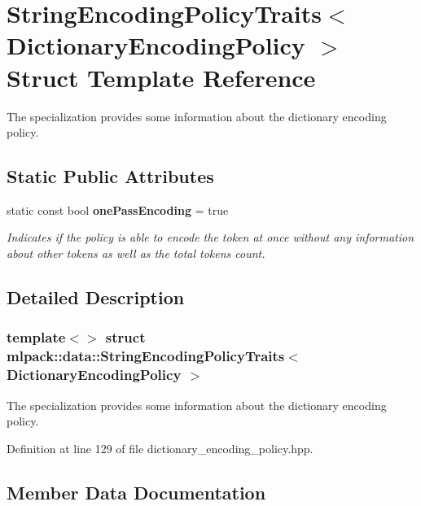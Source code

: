 \section{String\+Encoding\+Policy\+Traits$<$ Dictionary\+Encoding\+Policy $>$ Struct Template Reference}
\label{structmlpack_1_1data_1_1StringEncodingPolicyTraits_3_01DictionaryEncodingPolicy_01_4}


The specialization provides some information about the dictionary encoding policy.  


\subsection*{Static Public Attributes}
\begin{DoxyCompactItemize}
\item 
static const bool \textbf{ one\+Pass\+Encoding} = true
\begin{DoxyCompactList}\small\item\em Indicates if the policy is able to encode the token at once without any information about other tokens as well as the total tokens count. \end{DoxyCompactList}\end{DoxyCompactItemize}


\subsection{Detailed Description}
\subsubsection*{template$<$$>$\newline
struct mlpack\+::data\+::\+String\+Encoding\+Policy\+Traits$<$ Dictionary\+Encoding\+Policy $>$}

The specialization provides some information about the dictionary encoding policy. 

Definition at line 129 of file dictionary\+\_\+encoding\+\_\+policy.\+hpp.



\subsection{Member Data Documentation}
\mbox{\label{structmlpack_1_1data_1_1StringEncodingPolicyTraits_3_01DictionaryEncodingPolicy_01_4_ac6219b2b20133fd3cedfca6a54ec9683}} 
